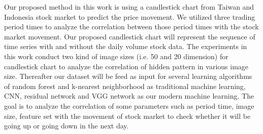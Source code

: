 \documentclass[10pt,twocolumn]{article}
\begin{document}
\par 
Our proposed method in this work is using a candlestick chart from Taiwan and Indonesia stock market to predict the price movement. We utilized  three trading period times to analyze the correlation between those period times with the stock market movement. Our proposed candlestick chart will represent the sequence of time series with and without the daily volume stock data. The experiments in this work conduct two kind of image sizes (i.e. 50 and 20 dimension) for candlestick chart to analyze the correlation of hidden pattern in various image size. Thereafter our dataset will be feed as input for several learning algorithms of random forest and k-nearest neighborhood as traditional machine learning, CNN, residual network and VGG network as our modern machine learning. The goal is to analyze the correlation of some parameters such as period time, image size, feature set with the movement of stock market to check whether it will be going up or going down in the next day.
\end{document}
